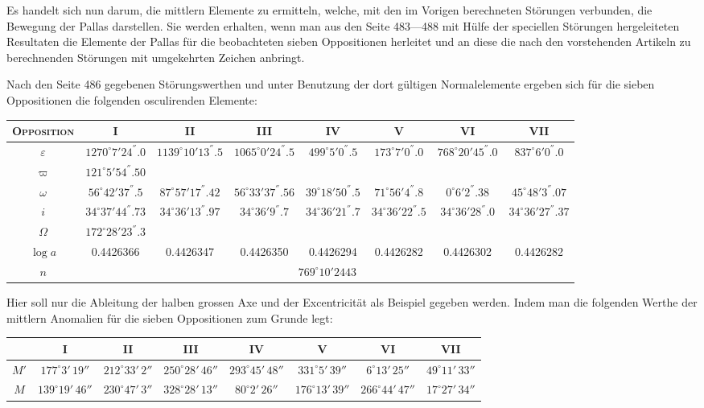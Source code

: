 \documentclass[12pt,a4paper]{article}
\begin{document}
Es handelt sich nun darum, die mittlern Elemente zu ermitteln, welche, mit den im Vorigen berechneten Störungen verbunden, die Bewegung der Pallas darstellen. Sie werden erhalten, wenn man aus den Seite 483---488 mit Hülfe der speciellen Störungen hergeleiteten Resultaten die Elemente der Pallas für die beobachteten sieben Oppositionen herleitet und an diese die nach den vorstehenden Artikeln zu berechnenden Störungen mit umgekehrten Zeichen anbringt.

Nach den Seite 486 gegebenen Störungswerthen und unter Benutzung der dort gültigen Normalelemente ergeben sich für die sieben Oppositionen die folgenden osculirenden Elemente:

\begin{center}
\begin{tabular}{@{}c|c|c|c|c|c|c|c@{}}
\textsc{Opposition} & I & II & III & IV & V & VI & VII\\
\midrule
$\varepsilon$ & $1270^{\circ} 7' 24^{''}.0$ & $1139^{\circ} 10' 13^{''}.5$ & $1065^{\circ} 0' 24^{''}.5$ & $499^{\circ} 5' 0^{''}.5$ & $173^{\circ} 7' 0^{''}.0$ & $768^{\circ} 20' 45^{''}.0$ & $837^{\circ} 6' 0^{''}.0$\\
$\varpi$ & $121^{\circ} 5' 54^{''}.50$ & & & & & & \\
$\omega$ & $56^{\circ} 42' 37^{''}.5$ & $87^{\circ} 57' 17^{''}.42$ & $56^{\circ} 33' 37^{''}.56$ & $39^{\circ} 18' 50^{''}.5$ & $71^{\circ} 56' 4^{''}.8$ & $0^{\circ} 6' 2^{''}.38$ & $45^{\circ} 48' 3^{''}.07$\\
$i$ & $34^{\circ} 37' 44^{''}.73$ & $34^{\circ} 36' 13^{''}.97$ & $34^{\circ} 36' 9^{''}.7$ & $34^{\circ} 36' 21^{''}.7$ & $34^{\circ} 36' 22^{''}.5$ & $34^{\circ} 36' 28^{''}.0$ & $34^{\circ} 36' 27^{''}.37$\\
$\Omega$ & $172^{\circ} 28' 23^{''}.3$ & & & & & & \\
$\log a$ & 0.4426366 & 0.4426347 & 0.4426350 & 0.4426294 & 0.4426282 & 0.4426302 & 0.4426282\\
$n$ & \multicolumn{7}{c}{$769^{\circ} 10' 2443$}\\
\end{tabular}
\end{center}

Hier soll nur die Ableitung der halben grossen Axe und der Excentricität als Beispiel gegeben werden. Indem man die folgenden Werthe der mittlern Anomalien für die sieben Oppositionen zum Grunde legt:

\begin{center}
\begin{tabular}{@{}c|ccccccc@{}}
 & I & II & III & IV & V & VI & VII\\
\midrule
$M'$ & $177^{\circ} 3'\, 19''$ & $212^{\circ} 33'\, 2''$ & $250^{\circ} 28'\, 46''$ & $293^{\circ} 45'\, 48''$ & $331^{\circ} 5'\, 39''$ & $6^{\circ} 13'\, 25''$ & $49^{\circ} 11'\, 33''$\\
$M$ & $139^{\circ} 19'\, 46''$ & $230^{\circ} 47'\, 3''$ & $328^{\circ} 28'\, 13''$ & $80^{\circ} 2'\, 26''$ & $176^{\circ} 13'\, 39''$ & $266^{\circ} 44'\, 47''$ & $17^{\circ} 27'\, 34''$
\end{tabular}
\end{center}
\end{document}
